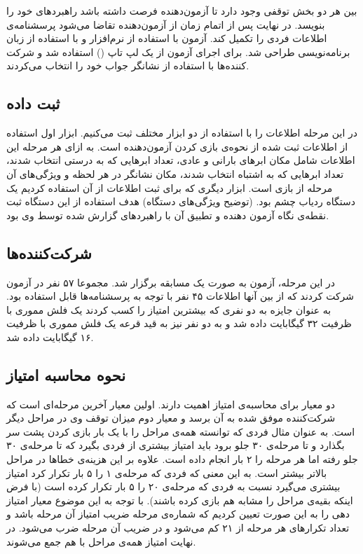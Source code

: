 \documentclass[twoside, a4paper,11pt]{book}
\numberwithin{equation}{chapter}
\numberwithin{table}{chapter}
\numberwithin{figure}{chapter}
\numberwithin{equation}{chapter}
\begin{document}
بین هر دو بخش توقفی وجود دارد تا آزمون‌دهنده فرصت داشته باشد راهبرد‌های خود را بنویسد. در نهایت پس از اتمام زمان از آزمون‌دهنده تقاضا می‌شود پرسشنامه‌ی اطلاعات فردی را تکمیل کند.
آزمون با استفاده از نرم‌افزار  و با استفاده از زبان برنامه‌نویسی   طراحی شد. برای اجرای آزمون از یک لپ تاپ () استفاده شد و شرکت کننده‌ها با استفاده از نشانگر جواب خود را انتخاب می‌کردند.

\subsection{ثبت داده}
در این مرحله اطلاعات را با استفاده از دو ابزار مختلف ثبت می‌کنیم. ابزار اول استفاده از اطلاعات ثبت شده از نحوه‌ی بازی کردن آزمون‌دهنده است. به ازای هر مرحله این اطلاعات شامل مکان ابرهای بارانی و عادی، تعداد ابرهایی که به درستی انتخاب شدند، تعداد ابرهایی که به اشتباه انتخاب شدند، مکان نشانگر در هر لحظه و ویژگی‌های آن مرحله از بازی است.
ابزار دیگری که برای ثبت اطلاعات از آن استفاده کردیم یک دستگاه ردیاب چشم بود. (توضیح ویژگی‌های دستگاه) هدف استفاده از این دستگاه ثبت نقطه‌ی نگاه آزمون دهنده و تطبیق آن با راهبرد‌های گزارش شده توسط وی بود.

\subsection{شرکت‌کننده‌ها}
در این مرحله، آزمون به صورت یک مسابقه برگزار شد. مجموعا ۵۷ نفر در آزمون شرکت کردند که از بین آنها اطلاعات ۴۵ نفر با توجه به پرسشنامه‌ها قابل استفاده بود. به عنوان جایزه به دو نفری که بیشترین امتیاز را کسب کردند یک فلش مموری با ظرفیت ۳۲ گیگابایت داده شد و به دو نفر نیز به قید قرعه یک فلش مموری با ظرفیت ۱۶ گیگابایت داده شد.

\subsection{نحوه محاسبه امتیاز}
دو معیار برای محاسبه‌ی امتیاز اهمیت دارند. اولین معیار آخرین مرحله‌ای است که شرکت‌کننده موفق شده به آن برسد و معیار دوم میزان توقف وی در مراحل دیگر است. به عنوان مثال فردی که توانسته همه‌ی مراحل را با یک بار بازی کردن پشت سر بگذارد و تا مرحله‌ی ۳۰ جلو برود باید امتیاز بیشتری از فردی بگیرد که تا مرحله‌ی ۳۰ جلو رفته اما هر مرحله را ۲ بار انجام داده است.
علاوه بر این هزینه‌ی خطاها در مراحل بالاتر بیشتر است. به این معنی که فردی که مرحله‌ی ۱ را ۵ بار تکرار کرد امتیاز بیشتری می‌گیرد نسبت به فردی که مرحله‌ی ۲۰ را ۵ بار تکرار کرده است (با فرض اینکه بقیه‌ی مراحل را مشابه هم بازی کرده باشند).
با توجه به این موضوع معیار امتیاز دهی را به این صورت تعیین کردیم که شماره‌ی مرحله ضریب امتیاز آن مرحله باشد و تعداد تکرارهای هر مرحله از ۲۱ کم می‌شود و در ضریب آن مرحله ضرب می‌شود. در نهایت امتیاز همه‌ی مراحل با هم جمع می‌شوند.
\end{document}
